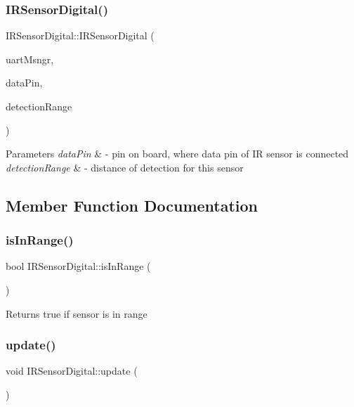 \subsubsection{\texorpdfstring{I\+R\+Sensor\+Digital()}{IRSensorDigital()}}
{\footnotesize\ttfamily I\+R\+Sensor\+Digital\+::\+I\+R\+Sensor\+Digital (\begin{DoxyParamCaption}\item[{\hyperlink{class_u_a_r_t_messenger}{U\+A\+R\+T\+Messenger} $\ast$const}]{uart\+Msngr,  }\item[{Pin\+Name}]{data\+Pin,  }\item[{float}]{detection\+Range }\end{DoxyParamCaption})}


\begin{DoxyParams}{Parameters}
{\em data\+Pin} & -\/ pin on board, where data pin of IR sensor is connected \\
\hline
{\em detection\+Range} & -\/ distance of detection for this sensor \\
\hline
\end{DoxyParams}


\subsection{Member Function Documentation}
\mbox{\label{class_i_r_sensor_digital_a749b91dae3e83900f6de49fcc908470d}} 
\subsubsection{\texorpdfstring{is\+In\+Range()}{isInRange()}}
{\footnotesize\ttfamily bool I\+R\+Sensor\+Digital\+::is\+In\+Range (\begin{DoxyParamCaption}{ }\end{DoxyParamCaption})}

\begin{DoxyReturn}{Returns}
true if sensor is in range 
\end{DoxyReturn}
\mbox{\label{class_i_r_sensor_digital_a8d09a546a1f4b4c6533c324d98a146a9}} 
\subsubsection{\texorpdfstring{update()}{update()}}
{\footnotesize\ttfamily void I\+R\+Sensor\+Digital\+::update (\begin{DoxyParamCaption}{ }\end{DoxyParamCaption})\hspace{0.3cm}{\ttfamily [virtual]}}


